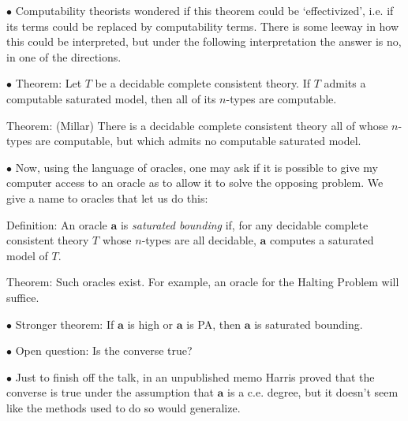 \documentclass{article}
\newcommand\Point[1]{\noindent \hspace{\labelsep} {\large $\bullet$ #1} \smallskip}
\begin{document}
\Point{Computability theorists wondered if this theorem could be `effectivized', i.e. if its terms could be replaced by computability terms. There is some leeway in how this could be interpreted, but under the following interpretation the answer is no, in one of the directions.}

\Point{Theorem: Let $T$ be a decidable complete consistent theory. If $T$ admits a computable saturated model, then all of its $n$-types are computable.

Theorem: (Millar) There is a decidable complete consistent theory all of whose $n$-types are computable, but which admits no computable saturated model.}

\Point{Now, using the language of oracles, one may ask if it is possible to give my computer access to an oracle as to allow it to solve the opposing problem. We give a name to oracles that let us do this:

Definition: An oracle $\mathbf{a}$ is \emph{saturated bounding} if, for any decidable complete consistent theory $T$ whose $n$-types are all decidable, $\mathbf{a}$ computes a saturated model of $T$.

Theorem: Such oracles exist. For example, an oracle for the Halting Problem will suffice.}

\Point{Stronger theorem: If $\mathbf{a}$ is high or $\mathbf{a}$ is PA, then $\mathbf{a}$ is saturated bounding.}

\Point{Open question: Is the converse true?}

\Point{Just to finish off the talk, in an unpublished memo Harris proved that the converse is true under the assumption that $\mathbf{a}$ is a c.e. degree, but it doesn't seem like the methods used to do so would generalize.}
\end{document}
